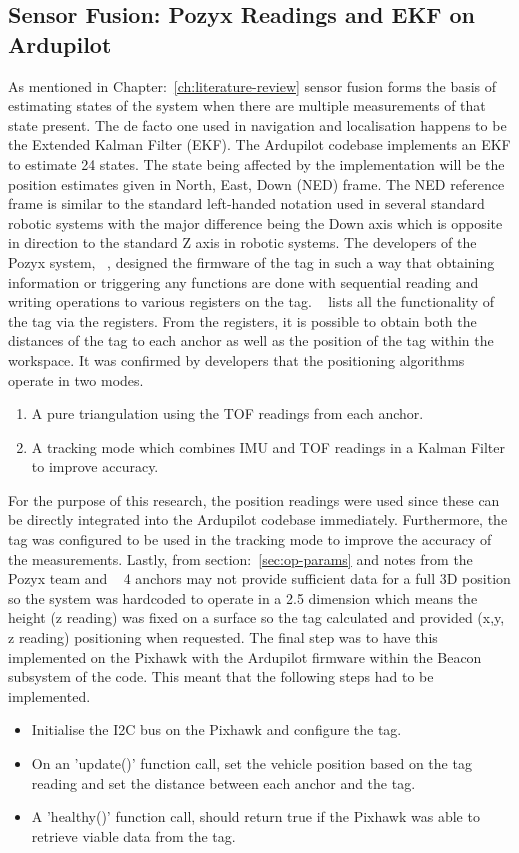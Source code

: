 \subsection{Sensor Fusion: Pozyx Readings and EKF on Ardupilot}\label{subsec:sensor-fusion}
As mentioned in Chapter:~\ref{ch:literature-review} sensor fusion forms the basis of estimating states of the system when there are multiple measurements of that state present.
The de facto one used in navigation and localisation happens to be the Extended Kalman Filter (EKF).
The Ardupilot codebase implements an EKF to estimate 24 states.
The state being affected by the implementation will be the position estimates given in North, East, Down (NED) frame.
The NED reference frame is similar to the standard left-handed notation used in several standard robotic systems with the major difference being the Down axis which is opposite in direction to the standard Z axis in robotic systems.
The developers of the Pozyx system, ~\cite{pozyx2018pozyx}, designed the firmware of the tag in such a way that obtaining information or triggering any functions are done with sequential reading and writing operations to various registers on the tag.
~\citet{devregs} lists all the functionality of the tag via the registers.
From the registers, it is possible to obtain both the distances of the tag to each anchor as well as the position of the tag within the workspace.
It was confirmed by developers that the positioning algorithms operate in two modes.
\begin{enumerate}
    \item A pure triangulation using the TOF readings from each anchor.
    \item A tracking mode which combines IMU and TOF readings in a Kalman Filter to improve accuracy.
\end{enumerate}
For the purpose of this research, the position readings were used since these can be directly integrated into the Ardupilot codebase immediately.
Furthermore, the tag was configured to be used in the tracking mode to improve the accuracy of the measurements.
Lastly, from section:~\ref{sec:op-params} and notes from the Pozyx team and ~\citet{evaluwb} 4 anchors may not provide sufficient data for a full 3D position so the system was hardcoded to operate in a 2.5 dimension which means the height (z reading) was fixed on a surface so the tag calculated and provided (x,y, z reading) positioning when requested.
The final step was to have this implemented on the Pixhawk with the Ardupilot firmware within the Beacon subsystem of the code.
This meant that the following steps had to be implemented.
\begin{itemize}
    \item Initialise the I2C bus on the Pixhawk and configure the tag.
    \item On an 'update()' function call, set the vehicle position based on the tag reading and set the distance between each anchor and the tag.
    \item A 'healthy()' function call, should return true if the Pixhawk was able to retrieve viable data from the tag.
\end{itemize}

